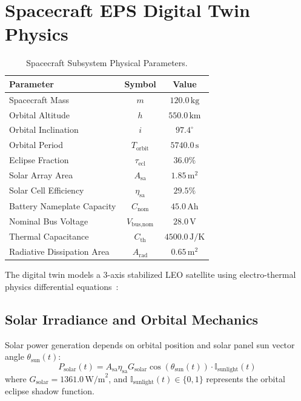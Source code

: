 \documentclass[10pt,twocolumn]{article}
\begin{document}
\section{Spacecraft EPS Digital Twin Physics}

\begin{table}[t]
\centering
\caption{Spacecraft Subsystem Physical Parameters.}
\label{tab:params}
\small
\setlength{\tabcolsep}{6pt}
\renewcommand{\arraystretch}{1.15}
\begin{tabular}{lcc}
\toprule
\textbf{Parameter} & \textbf{Symbol} & \textbf{Value} \\
\midrule
Spacecraft Mass & $m$ & $120.0\,\text{kg}$ \\
Orbital Altitude & $h$ & $550.0\,\text{km}$ \\
Orbital Inclination & $i$ & $97.4^\circ$ \\
Orbital Period & $T_{\text{orbit}}$ & $5740.0\,\text{s}$ \\
Eclipse Fraction & $\tau_{\text{ecl}}$ & $36.0\%$ \\
Solar Array Area & $A_{\text{sa}}$ & $1.85\,\text{m}^2$ \\
Solar Cell Efficiency & $\eta_{\text{sa}}$ & $29.5\%$ \\
Battery Nameplate Capacity & $C_{\text{nom}}$ & $45.0\,\text{Ah}$ \\
Nominal Bus Voltage & $V_{\text{bus,nom}}$ & $28.0\,\text{V}$ \\
Thermal Capacitance & $C_{\text{th}}$ & $4500.0\,\text{J/K}$ \\
Radiative Dissipation Area & $A_{\text{rad}}$ & $0.65\,\text{m}^2$ \\
\bottomrule
\end{tabular}
\end{table}

The digital twin models a 3-axis stabilized LEO satellite using electro-thermal physics differential equations~\cite{chen2012thevenin, wertz2011space}:

\subsection{Solar Irradiance and Orbital Mechanics}
Solar power generation depends on orbital position and solar panel sun vector angle $\theta_{\text{sun}}(t)$:
\begin{equation}
P_{\text{solar}}(t) = A_{\text{sa}} \eta_{\text{sa}} G_{\text{solar}} \cos(\theta_{\text{sun}}(t)) \cdot \mathbb{I}_{\text{sunlight}}(t)
\end{equation}
where $G_{\text{solar}} = 1361.0\,\text{W/m}^2$, and $\mathbb{I}_{\text{sunlight}}(t) \in \{0, 1\}$ represents the orbital eclipse shadow function.
\end{document}
